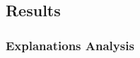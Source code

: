 \documentclass[english]{tktltiki2}
\theoremstyle{definition}
\theoremstyle{remark}
\begin{document}

%		
%		
%		
%


\subsection{Results}
\subsubsection{Explanations Analysis}
\end{document}
